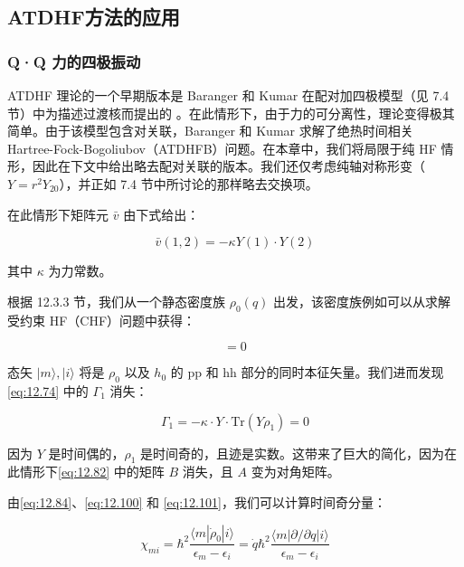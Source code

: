 \subsection{ATDHF方法的应用\label{subsec:12.3.6}}

\subsubsection{Q·Q 力的四极振动}

ATDHF 理论的一个早期版本是 Baranger 和 Kumar 在配对加四极模型（见 7.4 节）中为描述过渡核而提出的 \cite{BK68,Ku74a}。在此情形下，由于力的可分离性，理论变得极其简单。由于该模型包含对关联，Baranger
和 Kumar 求解了绝热时间相关 Hartree-Fock-Bogoliubov（ATDHFB）问题。在本章中，我们将局限于纯 HF
情形，因此在下文中给出略去配对关联的版本。我们还仅考虑纯轴对称形变（$Y=r^{2}Y_{20}$），并正如 7.4 节中所讨论的那样略去交换项。

在此情形下矩阵元 $\bar{v}$ 由下式给出：

\begin{equation}
\bar{v}(1,2)=-\kappa Y(1)\cdot Y(2)\label{eq:12.128}
\end{equation}

其中 $\kappa$ 为力常数。

根据 12.3.3 节，我们从一个静态密度族 $\rho_{0}(q)$ 出发，该密度族例如可以从求解受约束 HF（CHF）问题中获得：

\begin{equation}
[h_{0}(\rho_{0})-qY,\rho_{0}]=0\label{eq:12.129}
\end{equation}

态矢 $|m\rangle,|i\rangle$ 将是 $\rho_{0}$ 以及 $h_{0}$ 的 pp 和 hh 部分的同时本征矢量。我们进而发现\ref{eq:12.74}
中的 $\Gamma_{1}$ 消失：

\begin{equation}
\Gamma_{1}=-\kappa\cdot Y\cdot\mathrm{Tr}(Y\rho_{1})=0\label{eq:12.130}
\end{equation}

因为 $Y$ 是时间偶的，$\rho_{1}$ 是时间奇的，且迹是实数。这带来了巨大的简化，因为在此情形下\ref{eq:12.82}
中的矩阵 $B$ 消失，且 $A$ 变为对角矩阵。

由\ref{eq:12.84}、\ref{eq:12.100} 和 \ref{eq:12.101}，我们可以计算时间奇分量：

\begin{equation}
\chi_{mi}=\hbar^{2}\frac{\langle m|\dot{\rho}_{0}|i\rangle}{\epsilon_{m}-\epsilon_{i}}=\dot{q}\hbar^{2}\frac{\langle m|\partial/\partial q|i\rangle}{\epsilon_{m}-\epsilon_{i}}\label{eq:12.131}
\end{equation}

